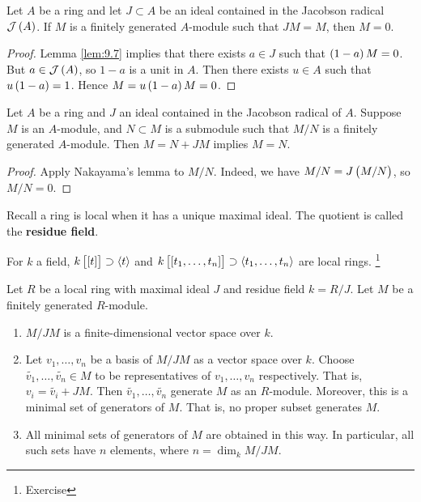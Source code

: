 \begin{theorem}
\label{thm:9.9}
Let $ A $ be a ring and let $ J \subset A $ be an ideal contained in the Jacobson radical $ \JJJ\br{A} $. If $ M $ is a finitely generated $ A $-module such that $ JM = M $, then $ M = 0 $.
\end{theorem}

\begin{proof}
Lemma \ref{lem:9.7} implies that there exists $ a \in J $ such that $ \br{1 - a}M = 0 $. But $ a \in \JJJ\br{A} $, so $ 1 - a $ is a unit in $ A $. Then there exists $ u \in A $ such that $ u\br{1 - a} = 1 $. Hence $ M = u\br{1 - a}M = 0 $.
\end{proof}

\begin{corollary}
\label{cor:9.10}
Let $ A $ be a ring and $ J $ an ideal contained in the Jacobson radical of $ A $. Suppose $ M $ is an $ A $-module, and $ N \subset M $ is a submodule such that $ M / N $ is a finitely generated $ A $-module. Then $ M = N + JM $ implies $ M = N $.
\end{corollary}

\begin{proof}
Apply Nakayama's lemma to $ M / N $. Indeed, we have $ M / N = J\br{M / N} $, so $ M / N = 0 $.
\end{proof}

\pagebreak

Recall a ring is local when it has a unique maximal ideal. The quotient is called the \textbf{residue field}.

\begin{example*}
For $ k $ a field, $ k\sbr{\sbr{t}} \supset \abr{t} $ and $ k\sbr{\sbr{t_1, \dots, t_n}} \supset \abr{t_1, \dots, t_n} $ are local rings. \footnote{Exercise}
\end{example*}

\begin{theorem}
\label{thm:9.11}
Let $ R $ be a local ring with maximal ideal $ J $ and residue field $ k = R / J $. Let $ M $ be a finitely generated $ R $-module.
\begin{enumerate}
\item $ M / JM $ is a finite-dimensional vector space over $ k $.
\item Let $ v_1, \dots, v_n $ be a basis of $ M / JM $ as a vector space over $ k $. Choose $ \widetilde{v_1}, \dots, \widetilde{v_n} \in M $ to be representatives of $ v_1, \dots, v_n $ respectively. That is, $ v_i = \widetilde{v_i} + JM $. Then $ \widetilde{v_1}, \dots, \widetilde{v_n} $ generate $ M $ as an $ R $-module. Moreover, this is a minimal set of generators of $ M $. That is, no proper subset generates $ M $.
\item All minimal sets of generators of $ M $ are obtained in this way. In particular, all such sets have $ n $ elements, where $ n = \dim_k M / JM $.
\end{enumerate}
\end{theorem}

